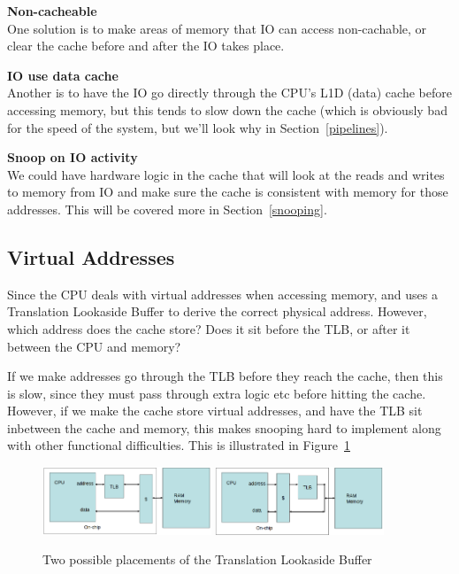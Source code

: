 \begin{description}
  \item \textbf{Non-cacheable}\\
    One solution is to make areas of memory that IO can access non-cachable, or
    clear the cache before and after the IO takes place.
  \item \textbf{IO use data cache}\\
    Another is to have the IO go directly through the CPU's L1D (data) cache
    before accessing memory, but this tends to slow down the cache (which is
    obviously bad for the speed of the system, but we'll look why in
    Section~\ref{pipelines}).
  \item \textbf{Snoop on IO activity}\\
    We could have hardware logic in the cache that will look at the reads and
    writes to memory from IO and make sure the cache is consistent with memory
    for those addresses. This will be covered more in Section~\ref{snooping}.
\end{description}

\subsection{Virtual Addresses}

Since the CPU deals with virtual addresses when accessing memory, and uses a
Translation Lookaside Buffer to derive the correct physical address. However,
which address does the cache store? Does it sit before the TLB, or after it
between the CPU and memory?

If we make addresses go through the TLB before they reach the cache, then this
is slow, since they must pass through extra logic etc before hitting the cache.
However, if we make the cache store virtual addresses, and have the TLB sit
inbetween the cache and memory, this makes snooping hard to implement along with
other functional difficulties. This is illustrated in Figure~\ref{tlb-pos}

\begin{figure}
  \centering
  \includegraphics[width=0.45\textwidth]{images/tlb-pos-before}
  \includegraphics[width=0.45\textwidth]{images/tlb-pos-after}
  \caption{Two possible placements of the Translation Lookaside Buffer}
  \label{tlb-pos}
\end{figure}

